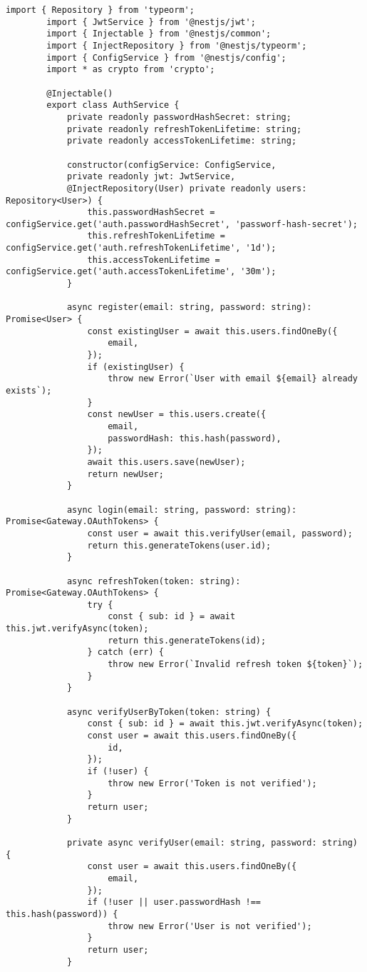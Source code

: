 	 \begin{lstlisting}[caption={auth.service.ts}]
	 	import { Repository } from 'typeorm';
	 	import { JwtService } from '@nestjs/jwt';
	 	import { Injectable } from '@nestjs/common';
	 	import { InjectRepository } from '@nestjs/typeorm';
	 	import { ConfigService } from '@nestjs/config';
	 	import * as crypto from 'crypto';
	 	
	 	@Injectable()
	 	export class AuthService {
	 		private readonly passwordHashSecret: string;    
	 		private readonly refreshTokenLifetime: string;
	 		private readonly accessTokenLifetime: string;
	 		
	 		constructor(configService: ConfigService,
	 		private readonly jwt: JwtService,
	 		@InjectRepository(User) private readonly users: Repository<User>) {
	 			this.passwordHashSecret = configService.get('auth.passwordHashSecret', 'passworf-hash-secret');
	 			this.refreshTokenLifetime = configService.get('auth.refreshTokenLifetime', '1d');
	 			this.accessTokenLifetime = configService.get('auth.accessTokenLifetime', '30m');
	 		}
	 		
	 		async register(email: string, password: string): Promise<User> {
	 			const existingUser = await this.users.findOneBy({
	 				email,
	 			});
	 			if (existingUser) {
	 				throw new Error(`User with email ${email} already exists`);
	 			}
	 			const newUser = this.users.create({
	 				email,
	 				passwordHash: this.hash(password),
	 			});
	 			await this.users.save(newUser);
	 			return newUser;
	 		}
	 		
	 		async login(email: string, password: string): Promise<Gateway.OAuthTokens> {
	 			const user = await this.verifyUser(email, password);
	 			return this.generateTokens(user.id);
	 		}
	 		
	 		async refreshToken(token: string): Promise<Gateway.OAuthTokens> {
	 			try {
	 				const { sub: id } = await this.jwt.verifyAsync(token);
	 				return this.generateTokens(id);
	 			} catch (err) {
	 				throw new Error(`Invalid refresh token ${token}`);
	 			}
	 		}
	 		
	 		async verifyUserByToken(token: string) {
	 			const { sub: id } = await this.jwt.verifyAsync(token);
	 			const user = await this.users.findOneBy({
	 				id,
	 			});
	 			if (!user) {
	 				throw new Error('Token is not verified');
	 			}
	 			return user;
	 		}
	 		
	 		private async verifyUser(email: string, password: string) {
	 			const user = await this.users.findOneBy({
	 				email,
	 			});
	 			if (!user || user.passwordHash !== this.hash(password)) {
	 				throw new Error('User is not verified');
	 			}
	 			return user;
	 		}
	 		

\end{lstlisting}
